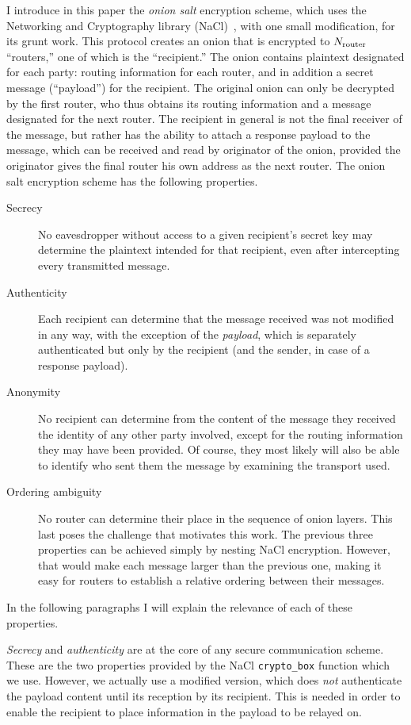 \documentclass[letterpaper,twocolumn,amsmath,amssymb,pre,aps,10pt]{revtex4-1}
\begin{document}
I introduce in this paper the \emph{onion salt} encryption scheme,
which uses the Networking and Cryptography library
(NaCl)~\cite{bernstein2009cryptography}, with one small modification,
for its grunt work.  This protocol creates an onion that is encrypted
to $N_{\text{router}}$ ``routers,'' one of which is the ``recipient.''  The
onion contains plaintext designated for each party: routing
information for each router, and in addition a secret message
(``payload'') for the recipient.  The original onion can only be
decrypted by the first router, who thus obtains its routing
information and a message designated for the next router.  The
recipient in general is not the final receiver of the message, but
rather has the ability to attach a response payload to the message,
which can be received and read by originator of the onion, provided
the originator gives the final router his own address as the next
router.  The onion salt encryption scheme has the following
properties.
\begin{description}
\item[Secrecy] No eavesdropper without access to a given recipient's
  secret key may determine the plaintext intended for that recipient,
  even after intercepting every transmitted message.
\item[Authenticity] Each recipient can determine that the message
  received was not modified in any way, with the exception of the
  \emph{payload}, which is separately authenticated but only by the
  recipient (and the sender, in case of a response payload).
\item[Anonymity] No recipient can determine from the content of the
  message they received the identity of any other party involved,
  except for the routing information they may have been provided.  Of
  course, they most likely will also be able to identify who sent them
  the message by examining the transport used.
\item[Ordering ambiguity] No router can determine their place in
  the sequence of onion layers.  This last poses the challenge that
  motivates this work.  The previous three properties can be achieved
  simply by nesting NaCl encryption.  However, that would make each
  message larger than the previous one, making it easy for routers to
  establish a relative ordering between their messages.
\end{description}
In the following paragraphs I will explain the relevance of each of
these properties.

\emph{Secrecy} and \emph{authenticity} are at the core of any secure
communication scheme.  These are the two properties provided by the
NaCl \verb!crypto_box! function which we use.  However, we actually
use a modified version, which does \emph{not} authenticate the payload
content until its reception by its recipient.  This is needed in order
to enable the recipient to place information in the payload to be
relayed on.
\end{document}
